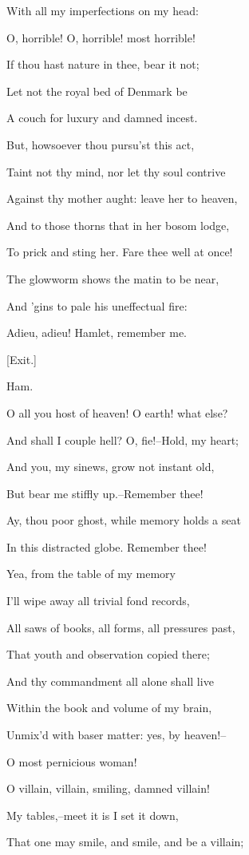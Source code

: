 \documentclass[12pt]{book}
\begin{document}
With all my imperfections on my head:

O, horrible! O, horrible! most horrible!

If thou hast nature in thee, bear it not;

Let not the royal bed of Denmark be

A couch for luxury and damned incest.

But, howsoever thou pursu'st this act,

Taint not thy mind, nor let thy soul contrive

Against thy mother aught: leave her to heaven,

And to those thorns that in her bosom lodge,

To prick and sting her. Fare thee well at once!

The glowworm shows the matin to be near,

And 'gins to pale his uneffectual fire:

Adieu, adieu! Hamlet, remember me.



[Exit.]



Ham.

O all you host of heaven! O earth! what else?

And shall I couple hell? O, fie!--Hold, my heart;

And you, my sinews, grow not instant old,

But bear me stiffly up.--Remember thee!

Ay, thou poor ghost, while memory holds a seat

In this distracted globe. Remember thee!

Yea, from the table of my memory

I'll wipe away all trivial fond records,

All saws of books, all forms, all pressures past,

That youth and observation copied there;

And thy commandment all alone shall live

Within the book and volume of my brain,

Unmix'd with baser matter: yes, by heaven!--

O most pernicious woman!

O villain, villain, smiling, damned villain!

My tables,--meet it is I set it down,

That one may smile, and smile, and be a villain;
\end{document}
